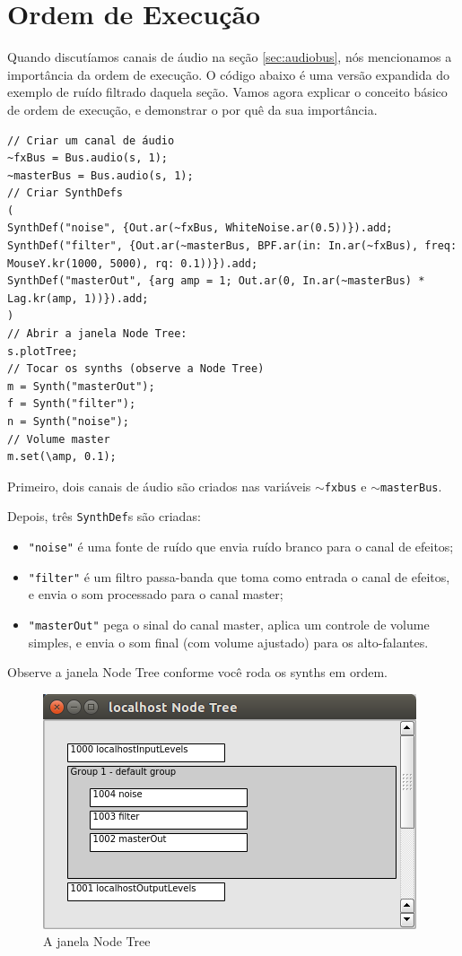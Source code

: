 \section{Ordem de Execução}
\label{sec:order-of-execution}

Quando discutíamos canais de áudio na seção \ref{sec:audiobus}, nós mencionamos a importância da ordem de execução. O código abaixo é uma versão expandida do exemplo de ruído filtrado daquela seção. Vamos agora explicar o conceito básico de ordem de execução, e demonstrar o por quê da sua importância.

\begin{lstlisting}[style=SuperCollider-IDE, basicstyle=\scttfamily\footnotesize]
// Criar um canal de áudio
~fxBus = Bus.audio(s, 1);
~masterBus = Bus.audio(s, 1);
// Criar SynthDefs
(
SynthDef("noise", {Out.ar(~fxBus, WhiteNoise.ar(0.5))}).add;
SynthDef("filter", {Out.ar(~masterBus, BPF.ar(in: In.ar(~fxBus), freq: MouseY.kr(1000, 5000), rq: 0.1))}).add;
SynthDef("masterOut", {arg amp = 1; Out.ar(0, In.ar(~masterBus) * Lag.kr(amp, 1))}).add;
)
// Abrir a janela Node Tree:
s.plotTree;
// Tocar os synths (observe a Node Tree)
m = Synth("masterOut");
f = Synth("filter");
n = Synth("noise");
// Volume master
m.set(\amp, 0.1);
\end{lstlisting}

Primeiro, dois canais de áudio são criados nas variáveis \texttt{$\sim$fxbus} e \texttt{$\sim$masterBus}.

Depois, três \texttt{SynthDef}s são criadas:

\begin{itemize}
\item \texttt{"noise"} é uma fonte de ruído que envia ruído branco para o canal de efeitos;
\item \texttt{"filter"} é um filtro passa-banda que toma como entrada o canal de efeitos, e envia o som processado para o canal master;
\item \texttt{"masterOut"} pega o sinal do canal master, aplica um controle de volume simples, e envia o som final (com volume ajustado) para os alto-falantes.
\end{itemize}

Observe a janela Node Tree conforme você roda os synths em ordem.

\begin{figure}[h]
\centerline{
	\includegraphics[scale=0.5]{fig-node-tree.png}}
\caption{A janela Node Tree}
\label{fig:node-tree}
\end{figure}


